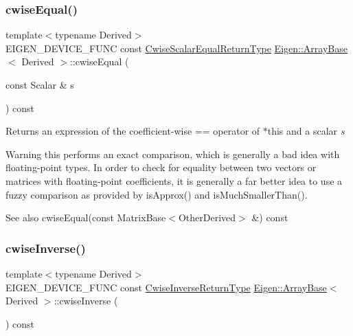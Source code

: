 \subsubsection{\texorpdfstring{cwiseEqual()}{cwiseEqual()}\hspace{0.1cm}{\footnotesize\ttfamily [2/2]}}
{\footnotesize\ttfamily template$<$typename Derived$>$ \\
E\+I\+G\+E\+N\+\_\+\+D\+E\+V\+I\+C\+E\+\_\+\+F\+U\+NC const \mbox{\hyperlink{class_eigen_1_1_cwise_binary_op}{Cwise\+Scalar\+Equal\+Return\+Type}} \mbox{\hyperlink{class_eigen_1_1_array_base}{Eigen\+::\+Array\+Base}}$<$ Derived $>$\+::cwise\+Equal (\begin{DoxyParamCaption}\item[{const Scalar \&}]{s }\end{DoxyParamCaption}) const\hspace{0.3cm}{\ttfamily [inline]}}

\begin{DoxyReturn}{Returns}
an expression of the coefficient-\/wise == operator of {\ttfamily $\ast$this} and a scalar {\itshape s} 
\end{DoxyReturn}
\begin{DoxyWarning}{Warning}
this performs an exact comparison, which is generally a bad idea with floating-\/point types. In order to check for equality between two vectors or matrices with floating-\/point coefficients, it is generally a far better idea to use a fuzzy comparison as provided by is\+Approx() and is\+Much\+Smaller\+Than().
\end{DoxyWarning}
\begin{DoxySeeAlso}{See also}
cwise\+Equal(const Matrix\+Base$<$\+Other\+Derived$>$ \&) const 
\end{DoxySeeAlso}
\mbox{\label{class_eigen_1_1_array_base_a37217e1af9759d31758b61cb9d9a2eb0}} 
\subsubsection{\texorpdfstring{cwiseInverse()}{cwiseInverse()}}
{\footnotesize\ttfamily template$<$typename Derived$>$ \\
E\+I\+G\+E\+N\+\_\+\+D\+E\+V\+I\+C\+E\+\_\+\+F\+U\+NC const \mbox{\hyperlink{class_eigen_1_1_cwise_unary_op}{Cwise\+Inverse\+Return\+Type}} \mbox{\hyperlink{class_eigen_1_1_array_base}{Eigen\+::\+Array\+Base}}$<$ Derived $>$\+::cwise\+Inverse (\begin{DoxyParamCaption}{ }\end{DoxyParamCaption}) const\hspace{0.3cm}{\ttfamily [inline]}}

